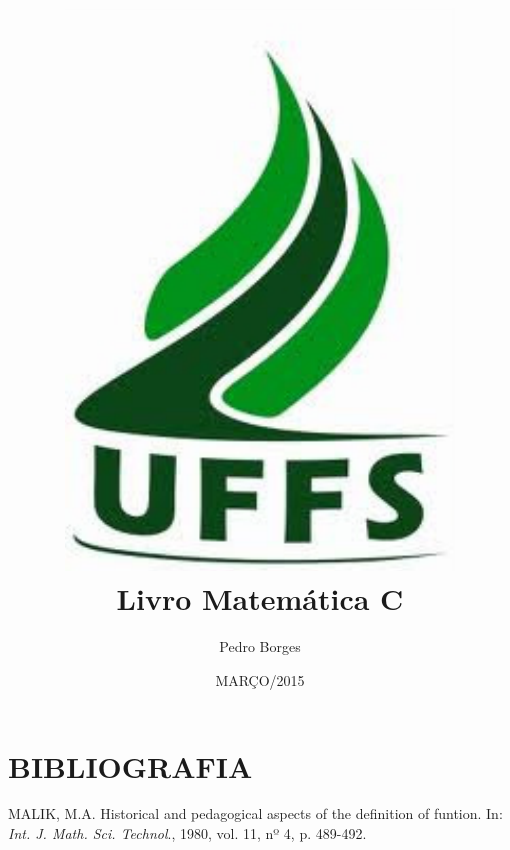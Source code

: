 \documentclass[12pt]{book}
\title{\includegraphics[scale=1]{recursos/logo_uffs.pdf}\\ Livro Matemática C}
\author{Pedro Borges}
\date{MARÇO/2015}
\theoremstyle{definition}
\begin{document}
\maketitle

\tableofcontents
\clearpage






















\clearpage

\chapter{BIBLIOGRAFIA}

MALIK, M.A. Historical and pedagogical aspects of the definition of funtion. In: \textit{Int. J. Math. Sci. Technol}., 1980, vol. 11, nº 4, p. 489-492.
\end{document}
